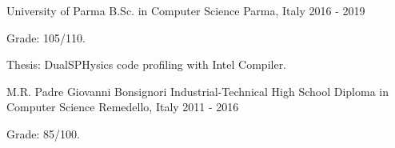 \begin{cventries}
  \cventry
    {University of Parma} %
    {B.Sc. in Computer Science} %
    {Parma, Italy} %
    {2016 - 2019} %
    {
      \begin{cvitems} %
        \item {Grade: 105/110.}
        \item {Thesis: DualSPHysics code profiling with Intel Compiler.}
      \end{cvitems}
    }

  \cventry
    {M.R. Padre Giovanni Bonsignori} %
    {Industrial-Technical High School Diploma in Computer Science} %
    {Remedello, Italy} %
    {2011 - 2016} %
    {
      \begin{cvitems} %
        \item {Grade: 85/100.}
      \end{cvitems}
    }

\end{cventries}
